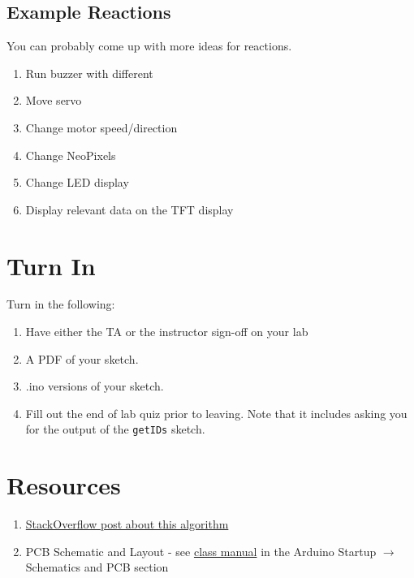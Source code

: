 \subsection{Example Reactions}
You can probably come up with more ideas for reactions.
\begin{enumerate}
    \item Run buzzer with different \lstinline@tone@s 
    \item Move servo 
    \item Change motor speed/direction
    \item Change NeoPixels
    \item Change LED display
    \item Display relevant data on the TFT display
\end{enumerate}

\section{Turn In}
Turn in the following:
\begin{enumerate}
    \item Have either the TA or the instructor sign-off on your lab
    \item A PDF of your sketch.
    \item .ino versions of your sketch.
    \item Fill out the end of lab quiz prior to leaving. Note that it includes asking you 
            for the output of the \lstinline$getIDs$ sketch. 
\end{enumerate}

\section{Resources}\label{sec:peakdetectionresources}
\begin{enumerate}
    \item \href{https://stackoverflow.com/a/22640362}{StackOverflow post about this algorithm}
    \item PCB Schematic and Layout - see 
            \href{https://github.com/semcneil/Fundamentals-of-Microcontrollers-Manual}{class manual} 
            in the Arduino Startup $\rightarrow$ Schematics and PCB section
\end{enumerate}


